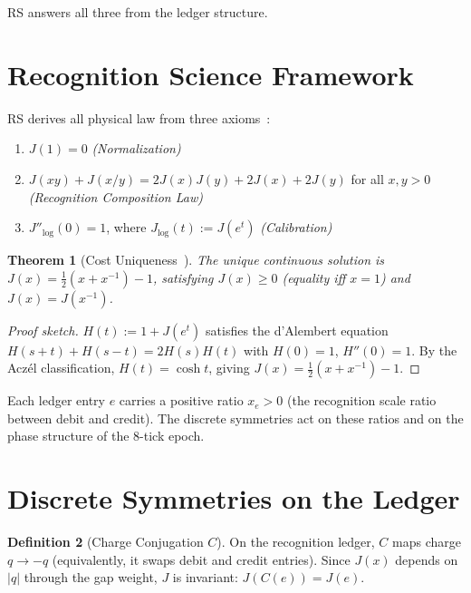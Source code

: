 \documentclass[12pt,a4paper]{article}
\newtheorem{theorem}{Theorem}[section]
\theoremstyle{definition}
\newtheorem{definition}[theorem]{Definition}
\theoremstyle{remark}
\begin{document}
RS answers all three from the ledger structure.

\section{Recognition Science Framework}
\label{sec:framework}

RS derives all physical law from three axioms~\cite{RS_Axioms}:
\begin{enumerate}[label=(A\arabic*),nosep]
  \item $J(1) = 0$ \hfill\textit{(Normalization)}
  \item $J(xy) + J(x/y) = 2J(x)J(y) + 2J(x) + 2J(y)$ for all $x,y>0$
  \hfill\textit{(Recognition Composition Law)}
  \item $J''_{\log}(0) = 1$, where $J_{\log}(t) := J(e^t)$
  \hfill\textit{(Calibration)}
\end{enumerate}

\begin{theorem}[Cost Uniqueness~\cite{RS_Axioms}]
\label{thm:J}
The unique continuous solution is $J(x) = \tfrac{1}{2}(x+x^{-1})-1$,
satisfying $J(x) \geq 0$ (equality iff $x=1$) and $J(x) = J(x^{-1})$.
\end{theorem}

\begin{proof}[Proof sketch]
$H(t) := 1+J(e^t)$ satisfies the d'Alembert equation $H(s+t)+H(s-t)=2H(s)H(t)$
with $H(0)=1$, $H''(0)=1$.  By the Acz\'el classification, $H(t)=\cosh t$,
giving $J(x) = \tfrac{1}{2}(x+x^{-1})-1$.
\end{proof}

Each ledger entry $e$ carries a positive ratio $x_e > 0$ (the recognition
scale ratio between debit and credit).  The discrete symmetries act on
these ratios and on the phase structure of the 8-tick epoch.

\section{Discrete Symmetries on the Ledger}
\label{sec:symmetries}

\begin{definition}[Charge Conjugation $C$]
On the recognition ledger, $C$ maps charge $q \to -q$
(equivalently, it swaps debit and credit entries).  Since
$J(x)$ depends on $|q|$ through the gap weight, $J$ is
invariant: $J(C(e)) = J(e)$.
\end{definition}
\end{document}
